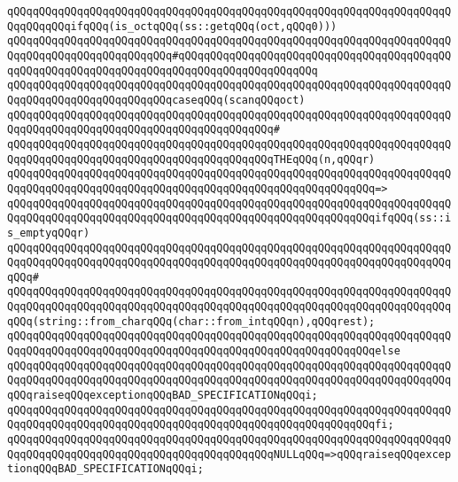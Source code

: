 \newline
\verb|qQQqqQQqqQQqqQQqqQQqqQQqqQQqqQQqqQQqqQQqqQQqqQQqqQQqqQQqqQQqqQQqqQQqqQQqqQQqqQQqifqQQq(is_octqQQq(ss::getqQQq(oct,qQQq0)))|\newline
\verb|qQQqqQQqqQQqqQQqqQQqqQQqqQQqqQQqqQQqqQQqqQQqqQQqqQQqqQQqqQQqqQQqqQQqqQQqqQQqqQQqqQQqqQQqqQQqqQQq#qQQqqQQqqQQqqQQqqQQqqQQqqQQqqQQqqQQqqQQqqQQqqQQqqQQqqQQqqQQqqQQqqQQqqQQqqQQqqQQqqQQqqQQqqQQq|\newline
\verb|qQQqqQQqqQQqqQQqqQQqqQQqqQQqqQQqqQQqqQQqqQQqqQQqqQQqqQQqqQQqqQQqqQQqqQQqqQQqqQQqqQQqqQQqqQQqqQQqcaseqQQq(scanqQQqoct)|\newline
\verb|qQQqqQQqqQQqqQQqqQQqqQQqqQQqqQQqqQQqqQQqqQQqqQQqqQQqqQQqqQQqqQQqqQQqqQQqqQQqqQQqqQQqqQQqqQQqqQQqqQQqqQQqqQQqqQQq#|\newline
\verb|qQQqqQQqqQQqqQQqqQQqqQQqqQQqqQQqqQQqqQQqqQQqqQQqqQQqqQQqqQQqqQQqqQQqqQQqqQQqqQQqqQQqqQQqqQQqqQQqqQQqqQQqqQQqqQQqTHEqQQq(n,qQQqr)|\newline
\verb|qQQqqQQqqQQqqQQqqQQqqQQqqQQqqQQqqQQqqQQqqQQqqQQqqQQqqQQqqQQqqQQqqQQqqQQqqQQqqQQqqQQqqQQqqQQqqQQqqQQqqQQqqQQqqQQqqQQqqQQqqQQqqQQq=>|\newline
\verb|qQQqqQQqqQQqqQQqqQQqqQQqqQQqqQQqqQQqqQQqqQQqqQQqqQQqqQQqqQQqqQQqqQQqqQQqqQQqqQQqqQQqqQQqqQQqqQQqqQQqqQQqqQQqqQQqqQQqqQQqqQQqqQQqifqQQq(ss::is_emptyqQQqr)|\newline
\verb|qQQqqQQqqQQqqQQqqQQqqQQqqQQqqQQqqQQqqQQqqQQqqQQqqQQqqQQqqQQqqQQqqQQqqQQqqQQqqQQqqQQqqQQqqQQqqQQqqQQqqQQqqQQqqQQqqQQqqQQqqQQqqQQqqQQqqQQqqQQqqQQq#|\newline
\verb|qQQqqQQqqQQqqQQqqQQqqQQqqQQqqQQqqQQqqQQqqQQqqQQqqQQqqQQqqQQqqQQqqQQqqQQqqQQqqQQqqQQqqQQqqQQqqQQqqQQqqQQqqQQqqQQqqQQqqQQqqQQqqQQqqQQqqQQqqQQqqQQq(string::from_charqQQq(char::from_intqQQqn),qQQqrest);|\newline
\verb|qQQqqQQqqQQqqQQqqQQqqQQqqQQqqQQqqQQqqQQqqQQqqQQqqQQqqQQqqQQqqQQqqQQqqQQqqQQqqQQqqQQqqQQqqQQqqQQqqQQqqQQqqQQqqQQqqQQqqQQqqQQqqQQqelse|\newline
\verb|qQQqqQQqqQQqqQQqqQQqqQQqqQQqqQQqqQQqqQQqqQQqqQQqqQQqqQQqqQQqqQQqqQQqqQQqqQQqqQQqqQQqqQQqqQQqqQQqqQQqqQQqqQQqqQQqqQQqqQQqqQQqqQQqqQQqqQQqqQQqqQQqraiseqQQqexceptionqQQqBAD_SPECIFICATIONqQQqi;|\newline
\verb|qQQqqQQqqQQqqQQqqQQqqQQqqQQqqQQqqQQqqQQqqQQqqQQqqQQqqQQqqQQqqQQqqQQqqQQqqQQqqQQqqQQqqQQqqQQqqQQqqQQqqQQqqQQqqQQqqQQqqQQqqQQqqQQqfi;|\newline
\newline
\verb|qQQqqQQqqQQqqQQqqQQqqQQqqQQqqQQqqQQqqQQqqQQqqQQqqQQqqQQqqQQqqQQqqQQqqQQqqQQqqQQqqQQqqQQqqQQqqQQqqQQqqQQqqQQqqQQqNULLqQQq=>qQQqraiseqQQqexceptionqQQqBAD_SPECIFICATIONqQQqi;|\newline
